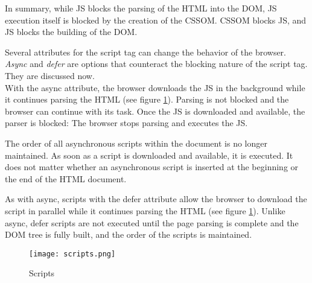 In summary, while JS blocks the parsing of the HTML into the DOM, JS execution itself is blocked by the creation of the CSSOM.
CSSOM blocks JS, and JS blocks the building of the DOM. %

Several attributes for the script tag can change the behavior of the browser.
\textit{Async} and \textit{defer} are options that counteract the blocking nature of the script tag.
They are discussed now. \\




With the async attribute, the browser downloads the JS in the background while it continues parsing the HTML (see figure \ref{figure:script_loading}).
Parsing is not blocked and the browser can continue with its task. 
Once the JS is downloaded and available, the parser is blocked: The browser stops parsing and executes the JS. %

The order of all asynchronous scripts within the document is no longer maintained.
As soon as a script is downloaded and available, it is executed.
It does not matter whether an asynchronous script is inserted at the beginning or the end of the HTML document. %




As with async, scripts with the defer attribute allow the browser to download the script in parallel while it continues parsing the HTML (see figure \ref{figure:script_loading}).
Unlike async, defer scripts are not executed until the page parsing is complete and the DOM tree is fully built, and the order of the scripts is maintained. %


\begin{figure}[h!]
\begin{center}
\texttt{[image: scripts.png]}
\caption{Scripts}
\label{figure:script_loading}
\end{center}
\end{figure}


